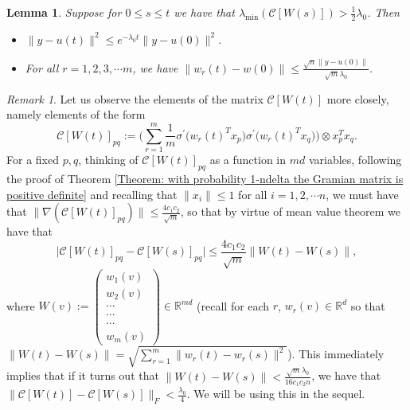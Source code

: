\documentclass[a4paper,11pt]{amsart}
\theoremstyle{definition}
\theoremstyle{plain}
\newtheorem{lmma}[dfn]{Lemma}
\theoremstyle{remark}
\newtheorem{rmrk}[dfn]{Remark}
\newcommand{\IR}{\mathbb{R}}
\newcommand{\ot}{\otimes}
\begin{document}
\begin{lmma}\label{Lemma: Lemma 3.3 from Overparametrization}
 Suppose for $0\leq s\leq t$ we have that $\lambda_{\min}(\mathcal{C}[W(s)])>\frac{1}{2}\lambda_0$. Then 
 \begin{itemize}
  \item[(a)]
  $\|y-u(t)\|^2\leq e^{-\lambda_0 t}\|y-u(0)\|^2$.
  \item[(b)]
  For all $r=1,2,3,\cdots m$, we have $\|w_r(t)-w(0)\|\leq\frac{\sqrt{n}\|y-u(0)\|}{\sqrt{m}\lambda_0}$.
 \end{itemize}
\end{lmma}
\begin{rmrk}\label{Remark: Lipschitz coefficient allows us to control least eigenvalue in general}
Let us observe the elements of the matrix $\mathcal{C}[W(t)]$ more closely, namely elements of the form 
\[
\mathcal{C}[W(t)]_{pq}:=\Big(\sum_{r=1}^m \frac{1}{m}\sigma^\prime\Big(w_r(t)^Tx_p\Big)\sigma^\prime\Big(w_r(t)^Tx_q\Big)\Big)\ot x_p^Tx_q. 
\]
For a fixed $p,q$, thinking of $\mathcal{C}[W(t)]_{pq}$ as a function in $md$ variables, following the proof of Theorem \ref{Theorem: with probability 1-ndelta the Gramian matrix is positive definite} and recalling that $\|x_i\|\leq1$ for all $i=1,2,\cdots n$, we must have that $\|\nabla(\mathcal{C}[W(t)]_{pq})\|\leq\frac{4c_1c_2}{\sqrt{m}}$, so that by virtue of mean value theorem we have that 
\[
\Big|\mathcal{C}[W(t)]_{pq}-\mathcal{C}[W(s)]_{pq}\Big|\leq\frac{4c_1c_2}{\sqrt{m}}\|W(t)-W(s)\|, 
\]
where $W(v):=\begin{pmatrix}
w_1(v)\\w_2(v)\\\cdots\\\cdots\\\cdots\\w_m(v)              
             \end{pmatrix}
\in\IR^{md}$ \Big(recall for each $r$, $w_r(v)\in\IR^d$ so that\\ $\|W(t)-W(s)\|=\sqrt{\sum_{r=1}^m\|w_r(t)-w_r(s)\|^2}$\Big). This immediately implies that if it turns out that $\|W(t)-W(s)\|<\frac{\sqrt{m}\lambda_0}{16c_1c_2n}$, we have that $\|\mathcal{C}[W(t)]-\mathcal{C}[W(s)]\|_F<\frac{\lambda_0}{4}$. We will be using this in the sequel.
\end{rmrk}
\end{document}
